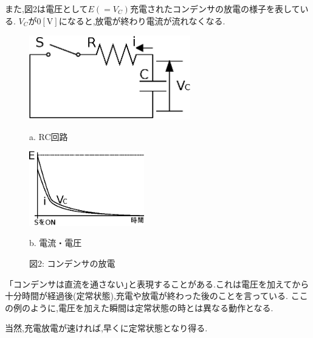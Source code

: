 \documentclass[uplatex]{jsarticle}
\begin{document}
		また,図2は電圧として$E(=V_{C})$充電されたコンデンサの放電の様子を表している. $V_{C}$が$0 [\mathrm V]$になると,放電が終わり電流が流れなくなる.
		\begin{figure}[H]
			\begin{minipage}{0.5\hsize}
				\begin{center}
					\includegraphics[width = 7cm]{2-a.eps}
				\end{center}
				\captionsetup{labelformat=empty,labelsep=none}
				\caption{a. RC回路}
			\end{minipage}
			\begin{minipage}{0.5\hsize}
				\begin{center}
					\includegraphics[width = 5cm]{2-b.eps}
				\end{center}
				\captionsetup{labelformat=empty,labelsep=none}
				\caption{b. 電流・電圧}
			\end{minipage}
			\captionsetup{labelformat=empty,labelsep=none}
			\caption{図2: コンデンサの放電}
		\end{figure}
		「コンデンサは直流を通さない｣と表現することがある.これは電圧を加えてから十分時間が経過後(定常状態),充電や放電が終わった後のことを言っている.
		ここの例のように,電圧を加えた瞬間は定常状態の時とは異なる動作となる.\par
		当然,充電放電が速ければ,早くに定常状態となり得る.
\end{document}

